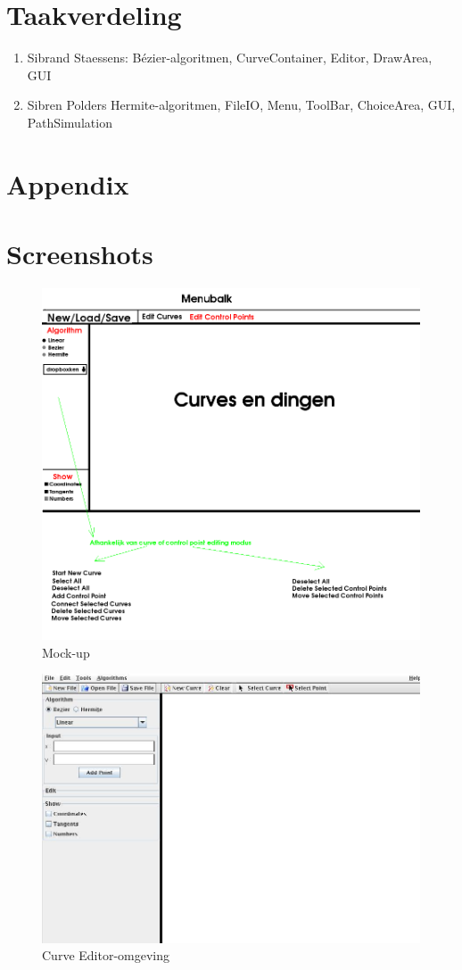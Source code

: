\documentclass[a4paper,11pt,oneside, titlepage]{article}
\begin{document}
\section{Taakverdeling}
\begin{enumerate}
\item Sibrand Staessens:
       B\'ezier-algoritmen, CurveContainer, Editor, DrawArea, GUI
\item Sibren Polders
       Hermite-algoritmen, FileIO, Menu, ToolBar, ChoiceArea, GUI, PathSimulation
\end{enumerate}
\newpage
\section{Appendix}
\appendix
\section{Screenshots}
\begin{figure}[htbp]
\centering
\includegraphics[scale=0.4]{./mockup.png}
\caption{Mock-up}\label{mock-up}
\end{figure}
\begin{figure}[htbp]
\centering
\includegraphics[scale=0.4]{./screenies/start.jpg}
\caption{Curve Editor-omgeving}\label{start}
\end{figure}
\end{document}
